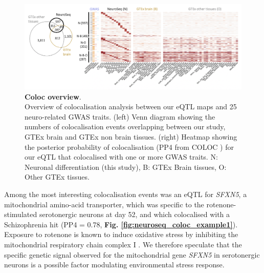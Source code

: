 \begin{figure}[h]
\centering
\includegraphics[width=16cm]{Chapter5/Fig/neuroseq_coloc_overview.png}
\caption[Coloc overview]{\textbf{Coloc overview}.\\
Overview of colocalisation analysis between our eQTL maps and 25 neuro-related GWAS traits. 
(left) Venn diagram showing the numbers of colocalisation events overlapping between our study, GTEx brain and GTEx non brain tissues. 
(right) Heatmap showing the posterior probability of colocalisation (PP4 from COLOC \cite{giambartolomei2014bayesian}) for our eQTL that colocalised with one or more GWAS traits. 
N: Neuronal differentiation (this study), B: GTEx Brain tissues, O: Other GTEx tissues.}
\label{fig:neuroseq_coloc_overview}
\end{figure}

\newpage

Among the most interesting colocalisation events was an eQTL for \textit{SFXN5}, a mitochondrial amino-acid transporter, which was specific to the rotenone-stimulated serotonergic neurons at day 52, and which colocalised with a Schizophrenia hit (PP4 = 0.78, \textbf{Fig. \ref{fig:neuroseq_coloc_example1}}). 
Exposure to rotenone is known to induce oxidative stress by inhibiting the mitochondrial respiratory chain complex I \cite{palmer1968studies, betarbet2000chronic}. 
We therefore speculate that the specific genetic signal observed for the mitochondrial gene \textit{SFXN5} in serotonergic neurons is a possible factor modulating environmental stress response.

